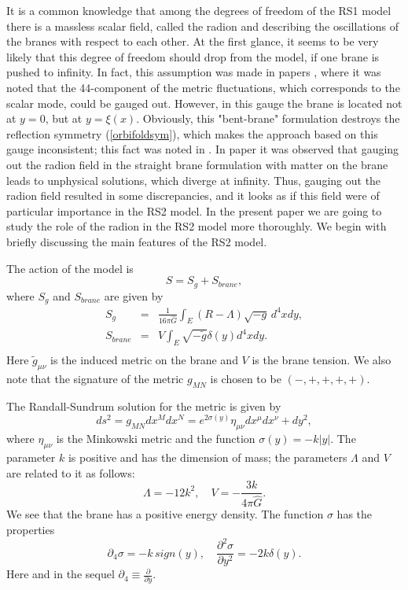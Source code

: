 \documentclass[a4paper,12pt]{article}
\begin{document}
It is a common knowledge that among the degrees of freedom of the
RS1 model there is a massless scalar field, called the radion
and describing the oscillations of the branes with respect to each other.
At the first glance, it seems to be very likely that this degree of freedom
should drop from the model,  if one brane is pushed to infinity. In fact, this
assumption was made in papers \cite{RS2,GarTan,RKatz}, where it was noted that
the 44-component of the metric fluctuations, which corresponds to the scalar
mode, could be gauged out. However, in this gauge the brane is located not at $y=0$,
but at $y=\xi(x)$. Obviously, this "bent-brane" formulation destroys the reflection
symmetry (\ref{orbifoldsym}), which makes the approach based on this gauge inconsistent;
this fact was noted in \cite{AIMVV}. In paper \cite{Kakushadze} it was observed that
gauging out the radion field in the straight brane formulation with matter on the brane
leads to unphysical solutions, which diverge at infinity. Thus,  gauging
out the radion field resulted in some discrepancies, and it looks as if this field
were of particular importance in the RS2 model. In the present paper we are going to
study the role of the radion in the RS2 model more thoroughly. We begin with briefly
discussing the main features of the RS2 model.

The action of the model is
\begin{equation}\label{actionRS}
 S = S_g + S_{brane},
\end{equation}
where $S_g$ and $S_{brane}$ are given by
\begin{eqnarray}\label{actionsRS}
S_g&=& \frac{1}{16 \pi \hat G} \int_E
\left(R-\Lambda\right)\sqrt{-g}\, d^{4}x dy,\\ \nonumber
 S_{brane}&=& V \int_E \sqrt{-\tilde g} \delta(y) d^{4}x dy.\\ \nonumber
\end{eqnarray}
{Here $\tilde g_{\mu\nu}$ is the induced metric on the brane and $V$ is the
brane tension.} We also note that the signature of the metric $g_{MN}$ is
chosen to be $(-,+,+,+,+)$.

The Randall-Sundrum solution for the  metric is {given by}
\begin{equation}\label{metricrs}
ds^2=  g_{MN} d{x}^M d{x}^N = e^{2\sigma(y)} \eta_{\mu\nu}
{dx^\mu dx^\nu} +
  dy^2,
\end{equation}
where $\eta_{\mu\nu}$ is the Minkowski metric and {the function}
$\sigma(y) = -k|y|$. The parameter  $k$ is positive and has the
dimension of mass; the parameters $\Lambda$ and $ V$ are {related
to it as follows:} $$ \Lambda = -12 k^2, \quad V = -\frac{3k}{4\pi
\hat G}. $$ We see that the brane has a positive energy density.
The function $\sigma$ has the properties
\begin{equation}\label{sigma}
  \partial_4 \sigma = -k\, sign(y), \quad \frac{\partial^2 \sigma}{\partial
  {y}^2} =-2k\delta(y).
\end{equation}
Here and in the sequel $\partial_4 \equiv \frac{\partial}{\partial y}$.
\end{document}
